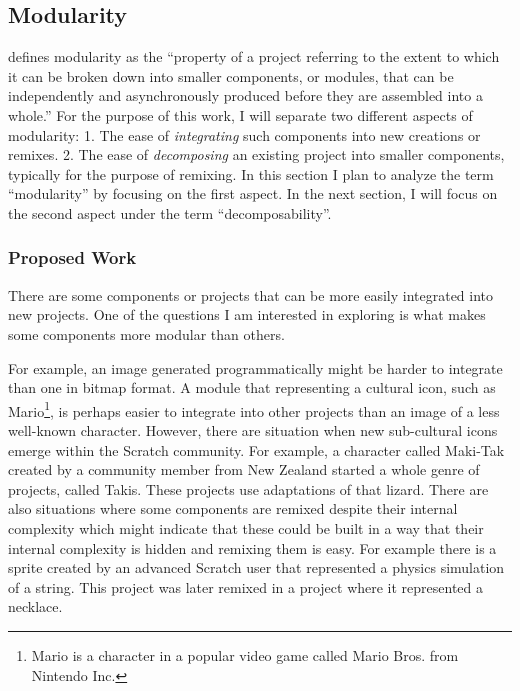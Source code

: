\subsection{Modularity}
\citet{benkler_coases_2002} defines modularity as the ``property of a project referring to the extent to which it can be broken down into smaller components, or modules, that can be independently and asynchronously produced before they are assembled into a whole.''
For the purpose of this work, I will separate two different aspects of modularity:
1. The ease of \emph{integrating} such components into new creations or remixes.
2. The ease of \emph{decomposing} an existing project into smaller components, typically for the purpose of remixing.
In this section I plan to analyze the term ``modularity'' by focusing on the first aspect.
In the next section, I will focus on the second aspect under the term ``decomposability''.

\subsubsection{Proposed Work}
There are some components or projects that can be more easily integrated into new projects. 
One of the questions I am interested in exploring is what makes some components more modular than others.

For example, an image generated programmatically might be harder to integrate than one in bitmap format. 
A module that representing a cultural icon, such as Mario\footnote{Mario is a character in a popular video game called Mario Bros. from Nintendo Inc.}, is perhaps easier to integrate into other projects than an image of a less well-known character.
However, there are situation when new sub-cultural icons emerge within the Scratch community.
For example, a character called Maki-Tak created by a community member from New Zealand started a whole genre of projects, called Takis.
These projects use adaptations of that lizard. 
There are also situations where some components are remixed despite their internal complexity which might indicate that these could be built in a way that their internal complexity is hidden and remixing them is easy. 
For example there is a sprite created by an advanced Scratch user that represented a physics simulation of a string. 
This project was later remixed in a project where it represented a necklace.

